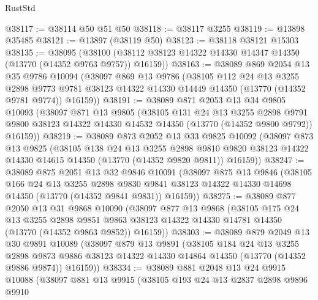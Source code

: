 \begin{lexlean}{RustStd}
\begin{coremodule}
@38117 := @38114 @50 @51 @50
@38118 := @38117 @3255
@38119 := @13898 @35485
@38121 := @13897 (@38119 @50)
@38123 := @38118 @38121 @15303
@38135 := @38095
    (@38100 (@38112 @38123 @14322 @14330 @14347 @14350 (@13770 (@14352 @9763 @9757)) @16159))
@38163 := @38089
    @869
    @2054
    @13
    @35
    @9786
    @10094
    (@38097
      @869
      @13
      @9786
      (@38105
        @112
        @24
        @13
        @3255
        @2898
        @9773
        @9781
        @38123
        @14322
        @14330
        @14449
        @14350
        (@13770 (@14352 @9781 @9774))
        @16159))
@38191 := @38089
    @871
    @2053
    @13
    @34
    @9805
    @10093
    (@38097
      @871
      @13
      @9805
      (@38105
        @131
        @24
        @13
        @3255
        @2898
        @9791
        @9800
        @38123
        @14322
        @14330
        @14532
        @14350
        (@13770 (@14352 @9800 @9792))
        @16159))
@38219 := @38089
    @873
    @2052
    @13
    @33
    @9825
    @10092
    (@38097
      @873
      @13
      @9825
      (@38105
        @138
        @24
        @13
        @3255
        @2898
        @9810
        @9820
        @38123
        @14322
        @14330
        @14615
        @14350
        (@13770 (@14352 @9820 @9811))
        @16159))
@38247 := @38089
    @875
    @2051
    @13
    @32
    @9846
    @10091
    (@38097
      @875
      @13
      @9846
      (@38105
        @166
        @24
        @13
        @3255
        @2898
        @9830
        @9841
        @38123
        @14322
        @14330
        @14698
        @14350
        (@13770 (@14352 @9841 @9831))
        @16159))
@38275 := @38089
    @877
    @2050
    @13
    @31
    @9868
    @10090
    (@38097
      @877
      @13
      @9868
      (@38105
        @175
        @24
        @13
        @3255
        @2898
        @9851
        @9863
        @38123
        @14322
        @14330
        @14781
        @14350
        (@13770 (@14352 @9863 @9852))
        @16159))
@38303 := @38089
    @879
    @2049
    @13
    @30
    @9891
    @10089
    (@38097
      @879
      @13
      @9891
      (@38105
        @184
        @24
        @13
        @3255
        @2898
        @9873
        @9886
        @38123
        @14322
        @14330
        @14864
        @14350
        (@13770 (@14352 @9886 @9874))
        @16159))
@38334 := @38089
    @881
    @2048
    @13
    @24
    @9915
    @10088
    (@38097
      @881
      @13
      @9915
      (@38105
        @193
        @24
        @13
        @2837
        @2898
        @9896
        @9910

\end{coremodule}
\end{lexlean}
